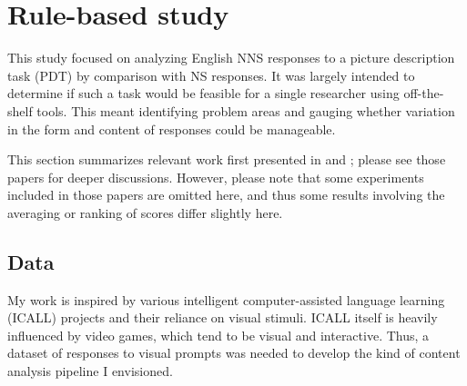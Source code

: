 
\section{Rule-based study}
\label{sec:pilot-study}
This study focused on analyzing English NNS responses to a picture description task (PDT) by comparison with NS responses. It was largely intended to determine if such a task would be feasible for a single researcher using off-the-shelf tools. This meant identifying problem areas and gauging whether variation in the form and content of responses could be manageable.

This section summarizes relevant work first presented in \citet{king:dickinson:13} and \citet{king:dickinson:14}; please see those papers for deeper discussions. However, please note that some experiments included in those papers are omitted here, and thus some results involving the averaging or ranking of scores differ slightly here.

\subsection{Data}
\label{sec:pilot-data}
My work is inspired by various intelligent computer-assisted language learning (ICALL) projects and their reliance on visual stimuli. ICALL itself is heavily influenced by video games, which tend to be visual and interactive. Thus, a dataset of responses to visual prompts was needed to develop the kind of content analysis pipeline I envisioned.

